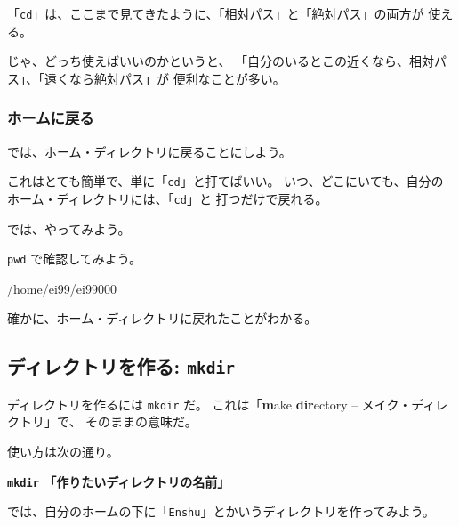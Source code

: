 「\texttt{cd}」は、ここまで見てきたように、「相対パス」と「絶対パス」の両方が
使える。

じゃ、どっち使えばいいのかというと、
「自分のいるとこの近くなら、相対パス」、「遠くなら絶対パス」が
便利なことが多い。

\subsubsection{ホームに戻る}

では、ホーム・ディレクトリに戻ることにしよう。

これはとても簡単で、単に「\texttt{cd}」と打てばいい。
いつ、どこにいても、自分のホーム・ディレクトリには、「\texttt{cd}」と
打つだけで戻れる。

では、やってみよう。

\begin{progls}
%
\end{progls}

\texttt{pwd} で確認してみよう。

\begin{progls}
/home/ei99/ei99000
%
\end{progls}

確かに、ホーム・ディレクトリに戻れたことがわかる。

\newpage

\subsection{ディレクトリを作る: \texttt{mkdir}}

ディレクトリを作るには \texttt{mkdir} だ。
これは「\textbf{m}ake \textbf{dir}ectory -- メイク・ディレクトリ」で、
そのままの意味だ。

使い方は次の通り。

\begin{center}
\begin{minipage}{10cm}
\begin{shadebox}
\smallskip
{\Large\bf \texttt{mkdir} 「作りたいディレクトリの名前」}
\smallskip
\end{shadebox}
\end{minipage}
\end{center}


では、自分のホームの下に「\texttt{Enshu}」とかいうディレクトリを作ってみよう。

\begin{progls}
%
\end{progls}

